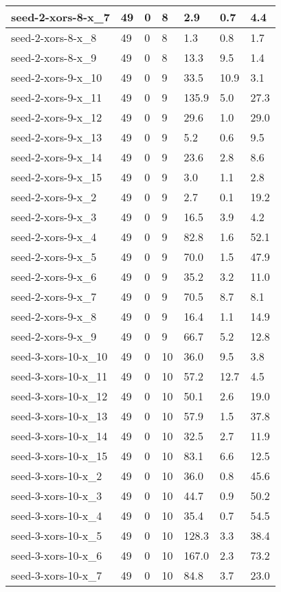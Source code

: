 \begin{scriptsize}
\begin{longtable}{|p{5cm}|l|l|l|l|l|l|}
seed-2-xors-8-x\_7&49&0&8&2.9&0.7&4.4 \\ \hline 
seed-2-xors-8-x\_8&49&0&8&1.3&0.8&1.7 \\ \hline 
seed-2-xors-8-x\_9&49&0&8&13.3&9.5&1.4 \\ \hline 
seed-2-xors-9-x\_10&49&0&9&33.5&10.9&3.1 \\ \hline 
seed-2-xors-9-x\_11&49&0&9&135.9&5.0&27.3 \\ \hline 
seed-2-xors-9-x\_12&49&0&9&29.6&1.0&29.0 \\ \hline 
seed-2-xors-9-x\_13&49&0&9&5.2&0.6&9.5 \\ \hline 
seed-2-xors-9-x\_14&49&0&9&23.6&2.8&8.6 \\ \hline 
seed-2-xors-9-x\_15&49&0&9&3.0&1.1&2.8 \\ \hline 
seed-2-xors-9-x\_2&49&0&9&2.7&0.1&19.2 \\ \hline 
seed-2-xors-9-x\_3&49&0&9&16.5&3.9&4.2 \\ \hline 
seed-2-xors-9-x\_4&49&0&9&82.8&1.6&52.1 \\ \hline 
seed-2-xors-9-x\_5&49&0&9&70.0&1.5&47.9 \\ \hline 
seed-2-xors-9-x\_6&49&0&9&35.2&3.2&11.0 \\ \hline 
seed-2-xors-9-x\_7&49&0&9&70.5&8.7&8.1 \\ \hline 
seed-2-xors-9-x\_8&49&0&9&16.4&1.1&14.9 \\ \hline 
seed-2-xors-9-x\_9&49&0&9&66.7&5.2&12.8 \\ \hline 
seed-3-xors-10-x\_10&49&0&10&36.0&9.5&3.8 \\ \hline 
seed-3-xors-10-x\_11&49&0&10&57.2&12.7&4.5 \\ \hline 
seed-3-xors-10-x\_12&49&0&10&50.1&2.6&19.0 \\ \hline 
seed-3-xors-10-x\_13&49&0&10&57.9&1.5&37.8 \\ \hline 
seed-3-xors-10-x\_14&49&0&10&32.5&2.7&11.9 \\ \hline 
seed-3-xors-10-x\_15&49&0&10&83.1&6.6&12.5 \\ \hline 
seed-3-xors-10-x\_2&49&0&10&36.0&0.8&45.6 \\ \hline 
seed-3-xors-10-x\_3&49&0&10&44.7&0.9&50.2 \\ \hline 
seed-3-xors-10-x\_4&49&0&10&35.4&0.7&54.5 \\ \hline 
seed-3-xors-10-x\_5&49&0&10&128.3&3.3&38.4 \\ \hline 
seed-3-xors-10-x\_6&49&0&10&167.0&2.3&73.2 \\ \hline 
seed-3-xors-10-x\_7&49&0&10&84.8&3.7&23.0 \\ \hline 

\end{longtable}
\end{scriptsize}
